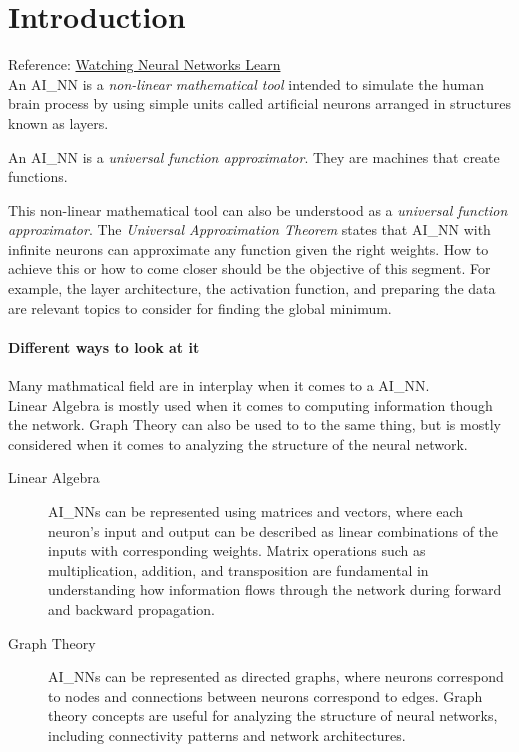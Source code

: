 \section{Introduction}

Reference: \href{https://youtu.be/TkwXa7Cvfr8?si=V8cJG_DQAoA2fndE}{Watching Neural Networks Learn}\\

An \gls{AI_NN} is a \textit{non-linear mathematical tool} intended to simulate the human brain process by using simple units called artificial neurons arranged in structures known as layers.
\begin{center}
	An \gls{AI_NN} is a \textit{universal function approximator}. They are machines that create functions.
\end{center}

This non-linear mathematical tool can also be understood as a \textit{universal function approximator}. The \textit{Universal Approximation Theorem} states that \gls{AI_NN} with infinite neurons can approximate any function given the right weights. How to achieve this or how to come closer should be the objective of this segment. For example, the layer architecture, the activation function, and preparing the data are relevant topics to consider for finding the global minimum.

\paragraph{Different ways to look at it}
Many mathmatical field are in interplay when it comes to a \gls{AI_NN}.\\

Linear Algebra is mostly used when it comes to computing information though the network. Graph Theory can also be used to to the same thing, but is mostly considered when it comes to analyzing the structure of the neural network. 

\begin{description}
	\item[Linear Algebra] \glspl{AI_NN} can be represented using matrices and vectors, where each neuron's input and output can be described as linear combinations of the inputs with corresponding weights. Matrix operations such as multiplication, addition, and transposition are fundamental in understanding how information flows through the network during forward and backward propagation.
	\item[Graph Theory] \glspl{AI_NN} can be represented as directed graphs, where neurons correspond to nodes and connections between neurons correspond to edges. Graph theory concepts are useful for analyzing the structure of neural networks, including connectivity patterns and network architectures.
\end{description}

